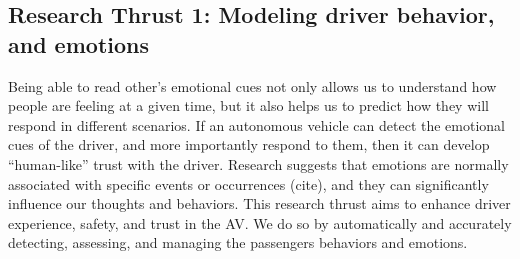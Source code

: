 \subsection{Research Thrust 1: Modeling driver behavior, and emotions}
\label{sec:behaviour}

 Being able to read other’s emotional cues not only allows us to understand how people are feeling at a given time, but it also helps us to predict how they will respond in different scenarios. 
 If an autonomous vehicle can detect the emotional cues of the driver, and more importantly respond to them, then it can develop ``human-like'' trust with the driver.
 Research suggests that emotions are normally associated with specific events or occurrences (cite), and they can significantly influence our thoughts and behaviors. 
 This research thrust aims to enhance driver experience, safety, and trust in the AV. 
 We do so by automatically and accurately detecting, assessing, and managing the passengers behaviors and emotions. 
 

